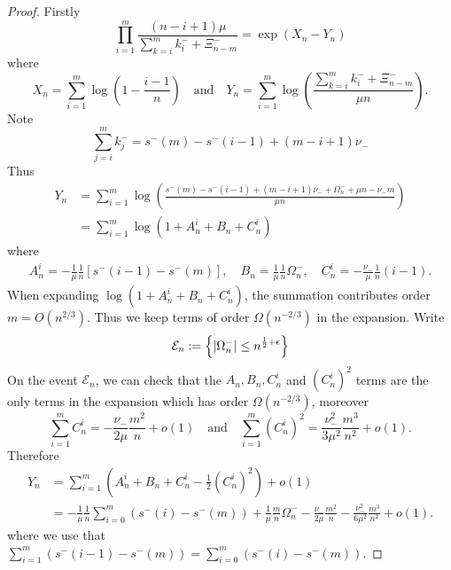 \documentclass[draft]{scrartcl}
\newcommand{\littleo}{o}
\newcommand{\defeq}{:=}
\DeclarePairedDelimiter{\abs}{\lvert}{\rvert}
\newcommand{\omegaevent}{\mathcal E}
\begin{document}
\begin{proof}
    Firstly
    \begin{equation}
        \prod_{i=1}^m \frac{(n-i+1)\mu}{\sum_{k=i}^m k^-_i + \Xi^-_{n-m}} = \exp(X_n - Y_n)
    \end{equation}
    where
    \begin{equation}
        X_n = \sum_{i=1}^m \log\left( 1 - \frac{i-1}{n} \right)
        \quad \text{and} \quad
        Y_n = \sum_{i=1}^m \log\left( \frac{\sum_{k=i}^m k_i^- + \Xi^-_{n-m}}{\mu n} \right).
    \end{equation}
    Note
    \begin{equation}
        \sum_{j=i}^m k^-_j = s^-(m) - s^-(i - 1) + (m - i + 1) \nu_-
    \end{equation}
    Thus
    \begin{align}
        Y_n 
        &= \sum_{i=1}^m \log \left( \frac{s^-(m) - s^-(i-1) + (m - i + 1) \nu_- + \Omega^-_n + \mu n - \nu_- m}{\mu n} \right) \\
        &= \sum_{i=1}^m \log \left( 1 + A_n^i + B_n + C_n^i \right)
    \end{align}
    where
    \begin{align}
        A_n^i = - \frac{1}{\mu} \frac{1}{n} \left[ s^-(i-1) - s^-(m) \right], \quad
        B_n = \frac{1}{\mu} \frac{1}{n} \Omega^-_n, \quad
        C_n^i = - \frac{\nu_-}{\mu} \frac{1}{n} (i-1).
    \end{align}
    When expanding $\log(1 + A_n^i + B_n + C_n^i)$, the summation contributes order $m = O(n^{2/3})$. Thus we keep terms of order $\Omega(n^{-2/3})$ in the expansion. Write
    \begin{equation}
        \omegaevent_n \defeq \left\{ \abs{\Omega^-_n} \leq n^{\frac{1}{2} + \epsilon} \right\}
    \end{equation}
    On the event $\omegaevent_n$, we can check that the $A_n, B_n, C_n^i$ and $(C_n^i)^2$ terms are the only terms in the expansion which has order $\Omega(n^{-2/3})$, moreover
    \begin{equation}
        \sum_{i=1}^m C_n^i = - \frac{\nu_-}{2 \mu} \frac{m^2}{n} + \littleo(1) \quad \text{and} \quad
        \sum_{i=1}^m (C_n^i)^2 = \frac{\nu_-^2}{3 \mu^2} \frac{m^3}{n^2} + \littleo(1).
    \end{equation}
    Therefore
    \begin{align}
        Y_n
        &= \sum_{i=1}^m (A_n^i + B_n + C_n^i - \tfrac{1}{2} (C_n^i)^2) + \littleo(1) \\
        &= - \frac{1}{\mu} \frac{1}{n} \sum_{i=0}^m \left( s^-(i) - s^-(m) \right)
        + \frac{1}{\mu} \frac{m}{n} \Omega_n^-
        - \frac{\nu_-}{2\mu} \frac{m^2}{n} - \frac{\nu_-^2}{6 \mu^2} \frac{m^3}{n^2} + \littleo(1).
    \end{align}
    where we use that $\sum_{i=1}^m \left( s^-(i-1) - s^-(m) \right) = \sum_{i=0}^m \left( s^-(i) - s^-(m) \right)$.


\end{proof}
\end{document}
